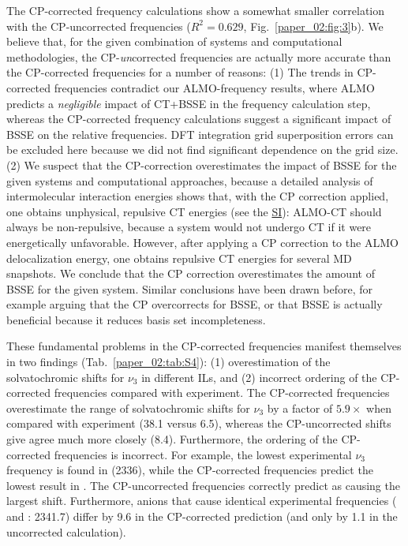 \documentclass[%
  class = book,%
  crop = false,%
  float = true,%
  multi = true,%
  preview = false,%
]{standalone}
\let\cite\autocite
\begin{document}
The CP-corrected frequency calculations show a somewhat smaller correlation with the CP-uncorrected frequencies (\(R^2 = 0.629\), Fig.~\ref{paper_02:fig:3}b). We believe that, for the given combination of systems and computational methodologies, the CP-\emph{un}corrected frequencies are actually more accurate than the CP-corrected frequencies for a number of reasons: (1) The trends in CP-corrected frequencies contradict our ALMO-frequency results, where ALMO predicts a \emph{negligible} impact of CT+BSSE in the frequency calculation step, whereas the CP-corrected frequency calculations suggest a significant impact of BSSE on the relative frequencies. DFT integration grid superposition errors can be excluded here because we did not find significant dependence on the grid size. (2) We suspect that the CP-correction overestimates the impact of BSSE for the given systems and computational approaches, because a detailed analysis of intermolecular interaction energies shows that, with the CP correction applied, one obtains unphysical, repulsive CT energies (see the \hyperref[SI]{SI}): ALMO-CT should always be non-repulsive, because a system would not undergo CT if it were energetically unfavorable. However, after applying a CP correction to the ALMO delocalization energy, one obtains repulsive CT energies for several MD snapshots. We conclude that the CP correction overestimates the amount of BSSE for the given system. Similar conclusions have been drawn before, for example arguing\cite{Collins1986} that the CP overcorrects for BSSE, or that BSSE is actually beneficial because it reduces basis set incompleteness.\cite{Mentel2014}

These fundamental problems in the CP-corrected frequencies manifest themselves in two findings (Tab.~\ref{paper_02:tab:S4}): (1) overestimation of the solvatochromic shifts for \(\nu_{3}\) in different ILs, and (2) incorrect ordering of the CP-corrected frequencies compared with experiment. The CP-corrected frequencies overestimate the range of solvatochromic shifts for \(\nu_{3}\) by a factor of \(5.9 \times\) when compared with experiment (\SI{38.1}{\wavenumber} versus \SI{6.5}{\wavenumber}), whereas the CP-uncorrected shifts give agree much more closely (\SI{8.4}{\wavenumber}). Furthermore, the ordering of the CP-corrected frequencies is incorrect. For example, the lowest experimental \(\nu_{3}\) frequency is found in \ce{[C4C1im][SCN]} (\SI{2336}{\wavenumber}), while the CP-corrected frequencies predict the lowest result in \ce{[C4C1im][DCA]}. The CP-uncorrected frequencies correctly predict \ce{[SCN]-} as causing the largest shift. Furthermore, anions that cause identical experimental frequencies (\ce{[Tf2N]-} and \ce{[BF4]-}: \SI{2341.7}{\wavenumber}) differ by \SI{9.6}{\wavenumber} in the CP-corrected prediction (and only by \SI{1.1}{\wavenumber} in the uncorrected calculation).
\end{document}

